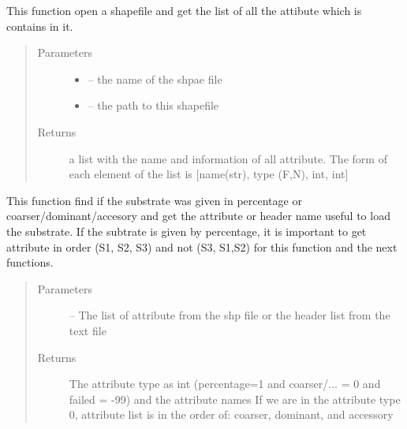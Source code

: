 \documentclass[letterpaper,10pt,english]{sphinxmanual}
\begin{document}

\begin{fulllineitems}
\label{\detokenize{index:src.substrate.get_all_attribute}}
This function open a shapefile and get the list of all the attibute which is contains in it.
\begin{quote}\begin{description}
\item[{Parameters}] \leavevmode\begin{itemize}
\item {} 
 -- the name of the shpae file

\item {} 
 -- the path to this shapefile

\end{itemize}

\item[{Returns}] \leavevmode
a list with the name and information of all attribute. The form of each element of the list
is {[}name(str), type (F,N), int, int{]}

\end{description}\end{quote}

\end{fulllineitems}


\begin{fulllineitems}
\label{\detokenize{index:src.substrate.get_useful_attribute}}
This function find if the substrate was given in percentage or coarser/dominant/accesory and get the attribute
or header name useful to load the substrate. If the subtrate is given by percentage, it is important to get
attribute in order (S1, S2, S3) and not (S3, S1,S2) for this function and the next functions.
\begin{quote}\begin{description}
\item[{Parameters}] \leavevmode
{} -- The list of attribute from the shp file or the header list from the text file

\item[{Returns}] \leavevmode
The attribute type as int (percentage=1 and coarser/... = 0 and failed = -99) and the attribute names
If we are in the attribute type 0, attribute list is in the order of: coarser, dominant, and accessory

\end{description}\end{quote}

\end{fulllineitems}
\end{document}
